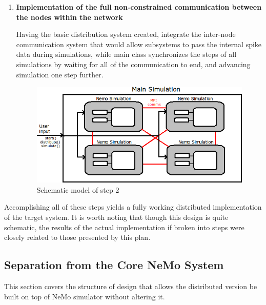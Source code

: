 \begin{enumerate}
\item{\textbf{Implementation of the full non-constrained communication between the nodes within the network}}

Having the basic distribution system created, integrate the inter-node communication system that would allow subsystems to pass the internal spike data during simulations, while main class synchronizes the steps of all simulations by
waiting for all of the communication to end, and advancing simulation one step further.

\begin{figure}[h!]
\begin{center}
\includegraphics[scale = 0.45]{images/design_stage_3.png}
\end{center}
\caption{Schematic model of step 2}
\end{figure}

\end{enumerate}

Accomplishing all of these steps yields a fully working distributed implementation of the target system. It is worth noting that though this design is quite schematic, the results of the actual implementation if broken into steps were closely related to those presented by this plan.

\subsection{Separation from the Core NeMo System}

This section covers the structure of design that allows the distributed version be built on top of NeMo simulator without altering it.


